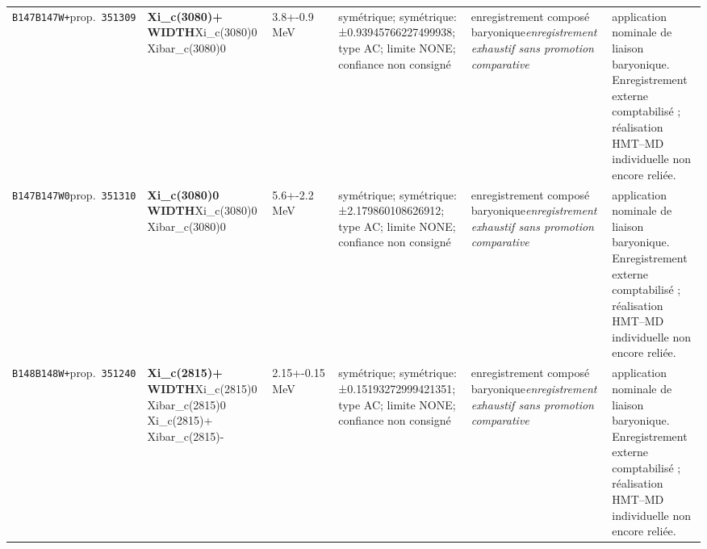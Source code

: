 \begin{landscape}
\begin{longtable}{L{1.85cm}L{4.45cm}L{2.35cm}L{4.05cm}L{3.35cm}L{7.15cm}}
\texttt{B147}\newline \texttt{B147W+}\newline prop.\ \texttt{351309} & \textbf{Xi\_\allowbreak{}c(3080)+ WIDTH}\newline Xi\_\allowbreak{}c(3080)0 \textbar{}\allowbreak{} Xibar\_\allowbreak{}c(3080)0 & 3.8+-0.9\,MeV & symétrique; symétrique: ±0.93945766227499938; type AC; limite NONE; confiance non consigné & enregistrement composé baryonique\newline \emph{enregistrement exhaustif sans promotion comparative} & application nominale de liaison baryonique. Enregistrement externe comptabilisé ; réalisation HMT--MD individuelle non encore reliée. \\
\texttt{B147}\newline \texttt{B147W0}\newline prop.\ \texttt{351310} & \textbf{Xi\_\allowbreak{}c(3080)0 WIDTH}\newline Xi\_\allowbreak{}c(3080)0 \textbar{}\allowbreak{} Xibar\_\allowbreak{}c(3080)0 & 5.6+-2.2\,MeV & symétrique; symétrique: ±2.179860108626912; type AC; limite NONE; confiance non consigné & enregistrement composé baryonique\newline \emph{enregistrement exhaustif sans promotion comparative} & application nominale de liaison baryonique. Enregistrement externe comptabilisé ; réalisation HMT--MD individuelle non encore reliée. \\
\texttt{B148}\newline \texttt{B148W+}\newline prop.\ \texttt{351240} & \textbf{Xi\_\allowbreak{}c(2815)+ WIDTH}\newline Xi\_\allowbreak{}c(2815)0 \textbar{}\allowbreak{} Xibar\_\allowbreak{}c(2815)0 \textbar{}\allowbreak{} Xi\_\allowbreak{}c(2815)+ \textbar{}\allowbreak{} Xibar\_\allowbreak{}c(2815)- & 2.15+-0.15\,MeV & symétrique; symétrique: ±0.15193272999421351; type AC; limite NONE; confiance non consigné & enregistrement composé baryonique\newline \emph{enregistrement exhaustif sans promotion comparative} & application nominale de liaison baryonique. Enregistrement externe comptabilisé ; réalisation HMT--MD individuelle non encore reliée. \\

\end{longtable}
\end{landscape}
